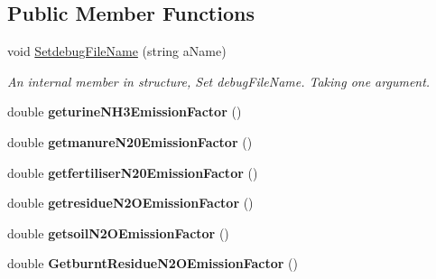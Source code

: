 \subsection*{Public Member Functions}
\begin{DoxyCompactItemize}
\item 
void \mbox{\hyperlink{struct_global_vars_1_1zone_specific_data_aca3aef5da8c090939b0184077cee32fb}{Setdebug\+File\+Name}} (string a\+Name)
\begin{DoxyCompactList}\small\item\em An internal member in structure, Set debug\+File\+Name. Taking one argument. \end{DoxyCompactList}\item 
\mbox{\label{struct_global_vars_1_1zone_specific_data_ae90609d5b7cd149c5c294fefb9764636}} 
double {\bfseries geturine\+N\+H3\+Emission\+Factor} ()
\item 
\mbox{\label{struct_global_vars_1_1zone_specific_data_a2b373b42989ed08ba5dea023efa0841d}} 
double {\bfseries getmanure\+N20\+Emission\+Factor} ()
\item 
\mbox{\label{struct_global_vars_1_1zone_specific_data_a315abec24440fe6abb6a88f4835cd3fa}} 
double {\bfseries getfertiliser\+N20\+Emission\+Factor} ()
\item 
\mbox{\label{struct_global_vars_1_1zone_specific_data_a982c21d86ca8d221f4ff9f9fd79248d9}} 
double {\bfseries getresidue\+N2\+O\+Emission\+Factor} ()
\item 
\mbox{\label{struct_global_vars_1_1zone_specific_data_af4de6e0c1faebf01ee86c89ed72aaa2a}} 
double {\bfseries getsoil\+N2\+O\+Emission\+Factor} ()
\item 
\mbox{\label{struct_global_vars_1_1zone_specific_data_a815b0b00dbb46f60ae07a381a2eb5c63}} 
double {\bfseries Getburnt\+Residue\+N2\+O\+Emission\+Factor} ()
\item 
\mbox{\label{struct_global_vars_1_1zone_specific_data_ac99a6a99127e34f98264a81a3fef7ba7}} 

\end{DoxyCompactItemize}
